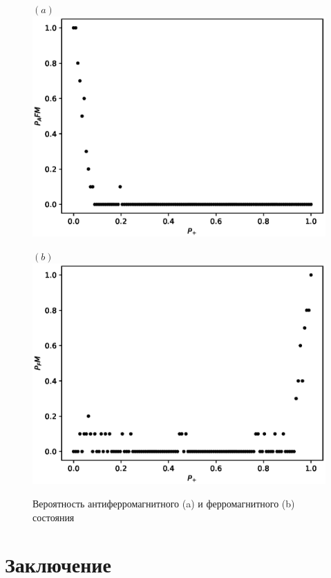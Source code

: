 \documentclass[utf8, babel, sor, jor, amsmath, amssymb, reprint]{elsarticle} %
\begin{document}
\begin{figure}[H]
	\begin{minipage}[h]{0.45\linewidth}
		\centering $(a)$
		\includegraphics[width=1\linewidth]{images/P_AFM_G(Mgs).eps}
	\end{minipage}
	\hfill
	\begin{minipage}[h]{0.45\linewidth}
		\centering $(b)$
		\includegraphics[width=1\linewidth]{images/P_FM_G(Mgs).eps}
	\end{minipage}
	\caption{Вероятность антиферромагнитного (a) и ферромагнитного (b) состояния}
	\label{fig:P_AFM_FM_G(Mgs)}
\end{figure}

\section{Заключение}
\end{document}
